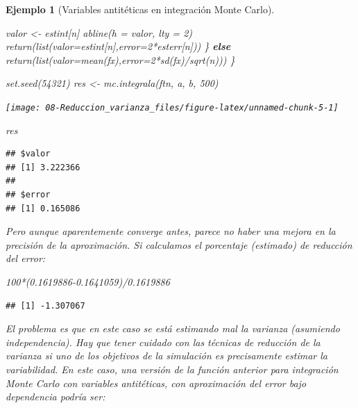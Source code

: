 \documentclass[
]{book}
\newenvironment{Shaded}{\begin{snugshade}}{\end{snugshade}}
\newcommand{\AttributeTok}[1]{\textcolor[rgb]{0.77,0.63,0.00}{#1}}
\newcommand{\ControlFlowTok}[1]{\textcolor[rgb]{0.13,0.29,0.53}{\textbf{#1}}}
\newcommand{\DecValTok}[1]{\textcolor[rgb]{0.00,0.00,0.81}{#1}}
\newcommand{\FloatTok}[1]{\textcolor[rgb]{0.00,0.00,0.81}{#1}}
\newcommand{\FunctionTok}[1]{\textcolor[rgb]{0.00,0.00,0.00}{#1}}
\newcommand{\NormalTok}[1]{#1}
\newcommand{\OtherTok}[1]{\textcolor[rgb]{0.56,0.35,0.01}{#1}}
\newcommand{\SpecialCharTok}[1]{\textcolor[rgb]{0.00,0.00,0.00}{#1}}
\theoremstyle{break}
\newtheorem{example}{Ejemplo}[chapter]
\theoremstyle{nonumberplain}
\begin{document}
\begin{example}[Variables antitéticas en integración Monte Carlo]
\begin{Shaded}
\begin{Highlighting}[]
\NormalTok{    valor }\OtherTok{\textless{}{-}}\NormalTok{ estint[n]}
    \FunctionTok{abline}\NormalTok{(}\AttributeTok{h =}\NormalTok{ valor, }\AttributeTok{lty =} \DecValTok{2}\NormalTok{)}
    \FunctionTok{return}\NormalTok{(}\FunctionTok{list}\NormalTok{(}\AttributeTok{valor=}\NormalTok{estint[n],}\AttributeTok{error=}\DecValTok{2}\SpecialCharTok{*}\NormalTok{esterr[n]))}
\NormalTok{  \} }\ControlFlowTok{else} \FunctionTok{return}\NormalTok{(}\FunctionTok{list}\NormalTok{(}\AttributeTok{valor=}\FunctionTok{mean}\NormalTok{(fx),}\AttributeTok{error=}\DecValTok{2}\SpecialCharTok{*}\FunctionTok{sd}\NormalTok{(fx)}\SpecialCharTok{/}\FunctionTok{sqrt}\NormalTok{(n)))}
\NormalTok{\}}

\FunctionTok{set.seed}\NormalTok{(}\DecValTok{54321}\NormalTok{)}
\NormalTok{res }\OtherTok{\textless{}{-}} \FunctionTok{mc.integrala}\NormalTok{(ftn, a, b, }\DecValTok{500}\NormalTok{)}
\end{Highlighting}
\end{Shaded}

\begin{center}\texttt{[image: 08-Reduccion\_varianza\_files/figure-latex/unnamed-chunk-5-1]} \end{center}

\begin{Shaded}
\begin{Highlighting}[]
\NormalTok{res}
\end{Highlighting}
\end{Shaded}

\begin{verbatim}
## $valor
## [1] 3.222366
## 
## $error
## [1] 0.165086
\end{verbatim}

Pero aunque aparentemente converge antes, parece no haber una mejora en la precisión de la aproximación.
Si calculamos el porcentaje (estimado) de reducción del error:

\begin{Shaded}
\begin{Highlighting}[]
\DecValTok{100}\SpecialCharTok{*}\NormalTok{(}\FloatTok{0.1619886{-}0.1641059}\NormalTok{)}\SpecialCharTok{/}\FloatTok{0.1619886}
\end{Highlighting}
\end{Shaded}

\begin{verbatim}
## [1] -1.307067
\end{verbatim}

El problema es que en este caso se está estimando mal la varianza (asumiendo independencia).
Hay que tener cuidado con las técnicas de reducción de la varianza si uno de los objetivos de la simulación es precisamente estimar la variabilidad.
En este caso, una versión de la función anterior para integración Monte Carlo con variables antitéticas, con aproximación del error bajo dependencia podría ser:


\end{example}
\end{document}
